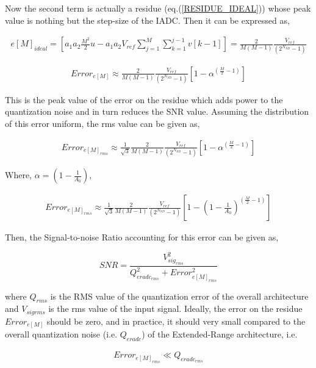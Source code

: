  Now the second term is actually a residue (eq.(\ref{RESIDUE_IDEAL})) whose peak value is nothing but the step-size of the IADC. Then it can be expressed as,
 
 \begin{align*}
    e[M]_{ideal}=\left[a_1a_2\frac{M^2}{2}u-a_1a_2V_{ref}\sum_{j=1}^{M}\sum_{k=1}^{j-1} v[k-1]\right]=\frac{2}{M(M-1)}\frac{V_{ref}}{\left(2^{N_{SD}}-1\right)}
\end{align*}


\begin{align}
    Error_{e[M]}\approx\frac{2}{M(M-1)}\frac{V_{ref}}{\left(2^{N_{SD}}-1\right)}\left[1-\alpha^{\left( \frac{M}{2}-1\right)}\right]
\end{align}

This is the peak value of the error on the residue which adds power to the quantization noise and in turn reduces the SNR value. Assuming the distribution of this error uniform, the rms value can be given as,

\begin{align}
    Error_{e[M]_{rms}}\approx\frac{1}{\sqrt{3}}\frac{2}{M(M-1)}\frac{V_{ref}}{\left(2^{N_{SD}}-1\right)}\left[1-\alpha^{\left( \frac{M}{2}-1\right)}\right]
\end{align}

Where, $\alpha = \left(1-\frac{1}{A_0}\right)$,

\begin{align}\label{ERROR_RMS}
    Error_{e[M]_{rms}}\approx\frac{1}{\sqrt{3}}\frac{2}{M(M-1)}\frac{V_{ref}}{\left(2^{N_{SD}}-1\right)}\left[1-\left(1-\frac{1}{A_0}\right)^{\left( \frac{M}{2}-1\right)}\right]
\end{align}

Then, the Signal-to-noise Ratio accounting for this error can be given as,

\begin{equation}\label{SNR}
    SNR = \frac{V_{sig_{rms}}^{2}}{Q_{eradc_{rms}}^2+Error_{e[M]_{rms}}^2}
\end{equation}

where $Q_{rms}$ is the RMS value of the quantization error of the overall architecture and $V_{sigrms}$ is the rms value of the input signal. Ideally, the error on the residue $Error_{e[M]}$ should be zero, and in practice, it should very small compared to the overall quantization noise (i.e. $Q_{eradc}$) of the Extended-Range architecture, i.e.


 \begin{align} \label{COMP_ERR}
     Error_{e[M]_{rms}}\ll Q_{eradc_{rms}}
 \end{align}
 

